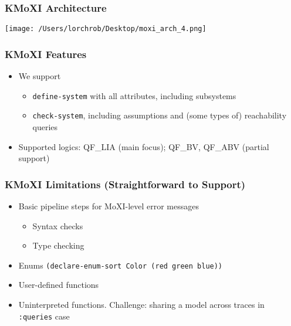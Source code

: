 \documentclass[11pt,xcolor={dvipsnames},hyperref={pdftex,pdfpagemode=UseNone,hidelinks,pdfdisplaydoctitle=true},usepdftitle=false]{beamer}
\newcommand{\code}[1]{{\footnotesize\texttt{#1}}}
\begin{document}
\begin{frame} 
    \frametitle{KMoXI Architecture}
    \texttt{[image: /Users/lorchrob/Desktop/moxi\_arch\_4.png]}
\end{frame}


\begin{frame}
    \frametitle{KMoXI Features} \pause
    \begin{itemize}
        \item We support
        \begin{itemize}
            \item \code{define-system} with all attributes, including subsystems
            \item \code{check-system}, including assumptions and (some types of) reachability queries
        \end{itemize} \pause
        \item Supported logics: QF\_LIA (main focus); QF\_BV, QF\_ABV (partial support)
    \end{itemize}
\end{frame} 

\begin{frame}
    \frametitle{KMoXI Limitations (Straightforward to Support)}
    \pause
    \begin{itemize}
        \item Basic pipeline steps for MoXI-level error messages
        \begin{itemize}
            \item Syntax checks 
            \item Type checking
        \end{itemize} 
        \pause
        \item Enums \newline 
        {\footnotesize \texttt{(declare-enum-sort Color (red green blue))}}
        \pause
        \item User-defined functions
        \item Uninterpreted functions. Challenge: sharing a model across traces in \code{:queries} case
    \end{itemize}
\end{frame}
\end{document}
